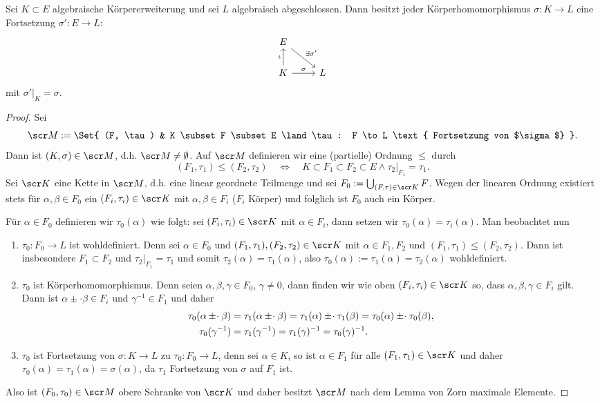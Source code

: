 \begin{st}[Fortsetzungsatz] \label{18.4-7}
	Sei $K \subset E$ algebraische Körpererweiterung und sei $L$ algebraisch abgeschlossen.
	Dann besitzt jeder Körperhomomorphismus $\sigma: K \to L$ eine Fortsetzung $\sigma': E \to L$:
	\[
		\begin{tikzcd}
			E \arrow{dr}{\exists \sigma'} & \\
			K \arrow{u}{\iota} \arrow{r}{\sigma} & L
		\end{tikzcd}
	\]
	mit $\sigma'|_K = \sigma$.
	\begin{proof}
		Sei
		\[
			\scr M
			:= \Set{ (F, \tau) & K \subset F \subset E \land \tau: F \to L \text{ Fortsetzung von $\sigma$} }.
		\]
		Dann ist $(K, \sigma) \in \scr M$, d.h. $\scr M \neq \emptyset$.
		Auf $\scr M$ definieren wir eine (partielle) Ordnung $\le$ durch
		\[
			(F_1, \tau_1) \le (F_2, \tau_2)
			\quad\iff\quad
			K \subset F_1 \subset F_2 \subset E
			\land \tau_2|_{F_1} = \tau_1.
		\]
		Sei $\scr K$ eine Kette in $\scr M$, d.h. eine linear geordnete Teilmenge und sei $F_0 := \bigcup_{(F,\tau) \in \scr K} F$.
		Wegen der linearen Ordnung existiert stets für $\alpha, \beta \in F_0$ ein $(F_i, \tau_i) \in \scr K$ mit $\alpha, \beta \in F_i$ ($F_i$ Körper) und folglich ist $F_0$ auch ein Körper.

		Für $\alpha \in F_0$ definieren wir $\tau_0(\alpha)$ wie folgt:
		sei $(F_i, \tau_i) \in \scr K$ mit $\alpha \in F_i$, dann setzen wir $\tau_0(\alpha) = \tau_i(\alpha)$.
		Man beobachtet nun
		\begin{enumerate}[1)]
			\item
				$\tau_0 : F_0 \to L$ ist wohldefiniert.
				Denn sei $\alpha \in F_0$ und $(F_1, \tau_1), (F_2, \tau_2) \in \scr K$ mit $\alpha \in F_1, F_2$ und \oBdA $(F_1, \tau_1) \le (F_2, \tau_2)$.
				Dann ist insbesondere $F_1 \subset F_2$ und $\tau_2|_{F_1} = \tau_1$ und somit $\tau_2(\alpha) = \tau_1(\alpha)$, also $\tau_0(\alpha) := \tau_1(\alpha) = \tau_2(\alpha)$ wohldefiniert.
			\item
				$\tau_0$ ist Körperhomomorphismus.
				Denn seien $\alpha, \beta, \gamma \in F_0$, $\gamma \neq 0$, dann finden wir wie oben $(F_i, \tau_i) \in \scr K$ so, dass $\alpha, \beta, \gamma \in F_i$ gilt.
				Dann ist $\alpha \pm \cdot \beta \in F_i$ und $\gamma^{-1} \in F_1$ und daher
				\begin{align*}
					\tau_0(\alpha \mathbin { \pm \mkern1mu \cdot } \beta)
					&= \tau_1(\alpha \mathbin { \pm \mkern1mu \cdot } \beta)
					= \tau_1(\alpha) \mathbin { \pm \mkern1mu \cdot } \tau_1(\beta)
					= \tau_0(\alpha) \mathbin { \pm \mkern1mu \cdot } \tau_0(\beta), \\
					\tau_0(\gamma^{-1})
					&= \tau_1(\gamma^{-1})
					= \tau_1(\gamma)^{-1}
					= \tau_0(\gamma)^{-1}.
				\end{align*}
			\item
				$\tau_0$ ist Fortsetzung von $\sigma: K \to L$ zu $\tau_0: F_0 \to L$, denn sei $\alpha \in K$, so ist $\alpha \in F_1$ für alle $(F_1, \tau_1) \in \scr K$ und daher $\tau_0(\alpha) = \tau_1(\alpha) = \sigma(\alpha)$, da $\tau_1$ Fortsetzung von $\sigma$ auf $F_1$ ist.
		\end{enumerate}
		Also ist $(F_0, \tau_0) \in \scr M$ obere Schranke von $\scr K$ und daher besitzt $\scr M$ nach dem Lemma von Zorn maximale Elemente.


\end{proof}
\end{st}
